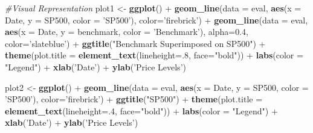 \documentclass[]{elsarticle} %
\newenvironment{Shaded}{\begin{snugshade}}{\end{snugshade}}
\newcommand{\KeywordTok}[1]{\textcolor[rgb]{0.13,0.29,0.53}{\textbf{{#1}}}}
\newcommand{\DataTypeTok}[1]{\textcolor[rgb]{0.13,0.29,0.53}{{#1}}}
\newcommand{\DecValTok}[1]{\textcolor[rgb]{0.00,0.00,0.81}{{#1}}}
\newcommand{\FloatTok}[1]{\textcolor[rgb]{0.00,0.00,0.81}{{#1}}}
\newcommand{\StringTok}[1]{\textcolor[rgb]{0.31,0.60,0.02}{{#1}}}
\newcommand{\CommentTok}[1]{\textcolor[rgb]{0.56,0.35,0.01}{\textit{{#1}}}}
\newcommand{\NormalTok}[1]{{#1}}
\begin{document}
\begin{Shaded}
\begin{Highlighting}[]
\CommentTok{#Visual Representation}
\NormalTok{plot1 <-}\StringTok{    }\KeywordTok{ggplot}\NormalTok{() +}
\StringTok{            }\KeywordTok{geom_line}\NormalTok{(}\DataTypeTok{data =} \NormalTok{eval, }\KeywordTok{aes}\NormalTok{(}\DataTypeTok{x =} \NormalTok{Date, }\DataTypeTok{y =} \NormalTok{SP500, }\DataTypeTok{color =} \StringTok{'SP500'}\NormalTok{), }
                      \DataTypeTok{color=}\StringTok{'firebrick'}\NormalTok{) +}
\StringTok{            }\KeywordTok{geom_line}\NormalTok{(}\DataTypeTok{data =} \NormalTok{eval, }\KeywordTok{aes}\NormalTok{(}\DataTypeTok{x =} \NormalTok{Date, }\DataTypeTok{y =} \NormalTok{benchmark, }\DataTypeTok{color =} \StringTok{'Benchmark'}\NormalTok{), }
                      \DataTypeTok{alpha=}\FloatTok{0.4}\NormalTok{, }\DataTypeTok{color=}\StringTok{'slateblue'}\NormalTok{) +}
\StringTok{                }\KeywordTok{ggtitle}\NormalTok{(}\StringTok{"Benchmark Superimposed on SP500"}\NormalTok{) +}\StringTok{ }
\StringTok{                }\KeywordTok{theme}\NormalTok{(}\DataTypeTok{plot.title =} \KeywordTok{element_text}\NormalTok{(}\DataTypeTok{lineheight=}\NormalTok{.}\DecValTok{8}\NormalTok{, }\DataTypeTok{face=}\StringTok{"bold"}\NormalTok{)) +}
\StringTok{                }\KeywordTok{labs}\NormalTok{(}\DataTypeTok{color =} \StringTok{"Legend"}\NormalTok{) +}
\StringTok{                }\KeywordTok{xlab}\NormalTok{(}\StringTok{'Date'}\NormalTok{) +}
\StringTok{                }\KeywordTok{ylab}\NormalTok{(}\StringTok{'Price Levels'}\NormalTok{)}

\NormalTok{plot2 <-}\StringTok{ }\KeywordTok{ggplot}\NormalTok{() +}\StringTok{ }\KeywordTok{geom_line}\NormalTok{(}\DataTypeTok{data =} \NormalTok{eval, }\KeywordTok{aes}\NormalTok{(}\DataTypeTok{x =} \NormalTok{Date, }\DataTypeTok{y =} \NormalTok{SP500, }\DataTypeTok{color =} \StringTok{'SP500'}\NormalTok{), }
                              \DataTypeTok{color=}\StringTok{'firebrick'}\NormalTok{) +}
\StringTok{                }\KeywordTok{ggtitle}\NormalTok{(}\StringTok{"SP500"}\NormalTok{) +}\StringTok{ }\KeywordTok{theme}\NormalTok{(}\DataTypeTok{plot.title =} \KeywordTok{element_text}\NormalTok{(}\DataTypeTok{lineheight=}\NormalTok{.}\DecValTok{4}\NormalTok{, }\DataTypeTok{face=}\StringTok{"bold"}\NormalTok{)) +}
\StringTok{                }\KeywordTok{labs}\NormalTok{(}\DataTypeTok{color =} \StringTok{"Legend"}\NormalTok{) +}
\StringTok{                }\KeywordTok{xlab}\NormalTok{(}\StringTok{'Date'}\NormalTok{) +}
\StringTok{                }\KeywordTok{ylab}\NormalTok{(}\StringTok{'Price Levels'}\NormalTok{)}


\end{Highlighting}
\end{Shaded}
\end{document}
